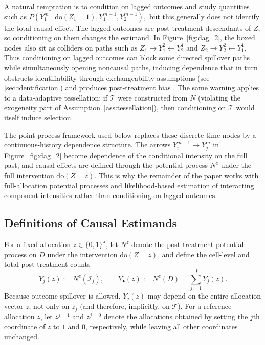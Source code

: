 \documentclass{statsoc}
\newcommand{\1}{\mathbbm{1}}
\newcommand{\Nproc}{N}
\begin{document}
A natural temptation is to condition on lagged outcomes and study quantities such as
\(
P\!\left(Y_1^m\mid \mathrm{do}(Z_1=1),Y_1^{m-1},Y_2^{m-1}\right),
\)
but this generally does not identify the total causal effect. The lagged outcomes are post-treatment descendants of \(Z\), so conditioning on them changes the estimand. In Figure~\ref{fig:dag_2}, the boxed nodes also sit as colliders on paths such as \(Z_1\to Y_1^2\leftarrow Y_2^1\) and \(Z_2\to Y_2^2\leftarrow Y_1^1\). Thus conditioning on lagged outcomes can block some directed spillover paths while simultaneously opening noncausal paths, inducing dependence that in turn obstructs identifiability through exchangeability assumptions (see \cref{sec:identification}) and produces post-treatment bias \citep{elwert2014endogenous}. %
 The same warning applies to a data-adaptive tessellation: if \(\mathcal T\) were constructed from \(\Nproc\) (violating the exogeneity part of Assumption~\ref{ass:tessellation}), then conditioning on \(\mathcal T\) would itself induce selection.





The point-process framework used below replaces these discrete-time nodes by a continuous-history dependence structure. The arrows \(Y_i^{m-1}\to Y_j^m\) in Figure~\ref{fig:dag_2} become dependence of the conditional intensity on the full past, and causal effects are defined through the potential process \(\Nproc^z\) under the full intervention \(\mathrm{do}(Z=z)\). This is why the remainder of the paper works with full-allocation potential processes and likelihood-based estimation of interacting component intensities rather than conditioning on lagged outcomes.

\subsection{Definitions of Causal Estimands}\label{sec:causalEstimands}

For a fixed allocation \(z\in\{0,1\}^J\), let \(\Nproc^z\) denote the post-treatment potential process on \(D\) under the intervention \(\mathrm{do}(Z=z)\), and define the cell-level and total post-treatment counts
\[
Y_j(z):=\Nproc^z(\mathcal I_j),\qquad
Y_\bullet(z):=\Nproc^z(D)=\sum_{j=1}^J Y_j(z).
\]
Because outcome spillover is allowed, \(Y_j(z)\) may depend on the entire allocation vector \(z\), not only on \(z_j\) (and therefore,  implicitly, on $\mathcal{T}$). For a reference allocation \(z\), let \(z^{j=1}\) and \(z^{j=0}\) denote the allocations obtained by setting the \(j\)th coordinate of \(z\) to \(1\) and \(0\), respectively, while leaving all other coordinates unchanged.
\end{document}
